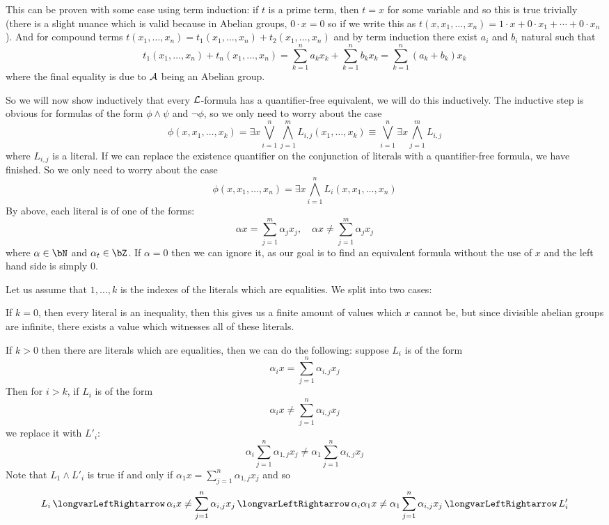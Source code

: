 \documentclass[10pt]{article}
\def\iff{\,\longvarLeftRightarrow\,}
\def\mL{{\cal L}}
\def\mA{{\cal A}}
\begin{document}
        This can be proven with some ease using term induction: if $t$ is a prime term, then $t=x$ for some variable and so this is true trivially (there is a slight nuance which is valid because in Abelian
        groups, $0\cdot x=0$ so if we write this as $t(x,x_1,\dots,x_n)=1\cdot x+0\cdot x_1+\cdots+0\cdot x_n$).
        And for compound terms $t(x_1,\dots,x_n)=t_1(x_1,\dots,x_n) + t_2(x_1,\dots,x_n)$ and by term induction there exist $a_i$ and $b_i$ natural such that
        \[ t_1(x_1,\dots,x_n) + t_n(x_1,\dots,x_n) = \sum_{k=1}^n a_kx_k + \sum_{k=1}^n b_kx_k = \sum_{k=1}^n (a_k+b_k)x_k \]
        where the final equality is due to $\mA$ being an Abelian group.

        So we will now show inductively that every $\mL$-formula has a quantifier-free equivalent, we will do this inductively.
        The inductive step is obvious for formulas of the form $\phi\land\psi$ and $\neg\phi$, so we only need to worry about the case
        \[ \phi(x,x_1,\dots,x_k) = \exists x\bigvee_{i=1}^n\bigwedge_{j=1}^m L_{i,j}(x_1,\dots,x_k) \equiv \bigvee_{i=1}^n\exists x\bigwedge_{j=1}^m L_{i,j} \]
        where $L_{i,j}$ is a literal.
        If we can replace the existence quantifier on the conjunction of literals with a quantifier-free formula, we have finished.
        So we only need to worry about the case
        \[ \phi(x,x_1,\dots,x_n) = \exists x\bigwedge_{i=1}^n L_i(x,x_1,\dots,x_n) \]
        By above, each literal is of one of the forms:
        \[ \alpha x = \sum_{j=1}^m \alpha_j x_j, \quad \alpha x \neq \sum_{j=1}^m \alpha_j x_j \]
        where $\alpha\in\bN$ and $\alpha_t\in\bZ$.
        If $\alpha=0$ then we can ignore it, as our goal is to find an equivalent formula without the use of $x$ and the left hand side is simply $0$.

        Let us assume that $1,\dots,k$ is the indexes of the literals which are equalities.
        We split into two cases:
        \benum
            \item If $k=0$, then every literal is an inequality, then this gives us a finite amount of values which $x$ cannot be, but since divisible abelian groups are infinite, there exists a value which
            witnesses all of these literals.

            \item If $k>0$ then there are literals which are equalities, then we can do the following: suppose $L_i$ is of the form
            \[ \alpha_i x = \sum_{j=1}^n \alpha_{i,j}x_j \]
            Then for $i>k$, if $L_i$ is of the form
            \[ \alpha_i x \neq \sum_{j=1}^n \alpha_{i,j}x_j \]
            we replace it with $L'_i$:
            \[ \alpha_i\sum_{j=1}^n \alpha_{1,j}x_j \neq \alpha_1\sum_{j=1}^n \alpha_{i,j}x_j \]
            Note that $L_1\land L'_i$ is true if and only if $\alpha_1 x=\sum_{j=1}^n\alpha_{1,j}x_j$ and so
            \[ L_i \iff \alpha_i x \neq \sum_{j=1}^n \alpha_{i,j}x_j \iff \alpha_i\alpha_1 x \neq \alpha_1\sum_{j=1}^n\alpha_{i,j}x_j \iff L'_i \]
\end{document}

